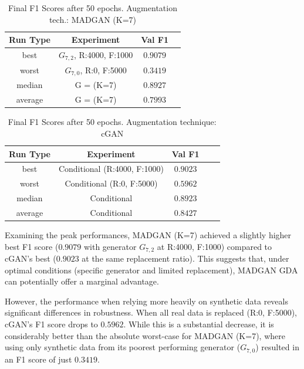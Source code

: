 \begin{table}[H]
	\vspace{-1.5em}
	\centering
	\begin{tabular}{|c|c|c|c|}
		\hline
		Run Type & Experiment & Val F1 \\ \hline
		best & \(G_{7, 2}\), R:4000, F:1000 & $0.9079$\\ \hline
		worst & \(G_{7, 0}\), R:0, F:5000 & $0.3419$\\ \hline
		median & G = (K=7) & $0.8927$\\ \hline
		average & G = (K=7) & $0.7993$
		\\ \hline
	\end{tabular}
    \caption{Final F1 Scores after 50 epochs. Augmentation tech.: MADGAN (K=7)}
        \label{tab:res_replacement_fashion_cgan_vs_madgan__madgan}
\end{table}
\begin{table}[H]
	\centering
	\vspace{-1.5em}
	\begin{tabular}{|c|c|c|c|c|}
		\hline
		Run Type & Experiment & Val F1 \\ \hline
		best & Conditional (R:4000, F:1000) & $0.9023$\\ \hline
		worst & Conditional (R:0, F:5000) & $0.5962$\\ \hline
		median & Conditional & $0.8923$\\ \hline
		average & Conditional & $0.8427$
		\\ \hline
	\end{tabular}
    \caption{Final F1 Scores after 50 epochs. Augmentation technique: cGAN}
        \label{tab:res_replacement_fashion_cgan_vs_madgan__cgan}
\end{table}
Examining the peak performances, MADGAN (K=7) achieved a slightly higher best F1 score ($0.9079$ with generator \(G_{7,2}\) at R:4000, F:1000) compared to cGAN's best ($0.9023$ at the same replacement ratio). This suggests that, under optimal conditions (specific generator and limited replacement), MADGAN GDA can potentially offer a marginal advantage.

However, the performance when relying more heavily on synthetic data reveals significant differences in robustness. When all real data is replaced (R:0, F:5000), cGAN's F1 score drops to $0.5962$. While this is a substantial decrease, it is considerably better than the absolute worst-case for MADGAN (K=7), where using only synthetic data from its poorest performing generator (\(G_{7,0}\)) resulted in an F1 score of just $0.3419$.

